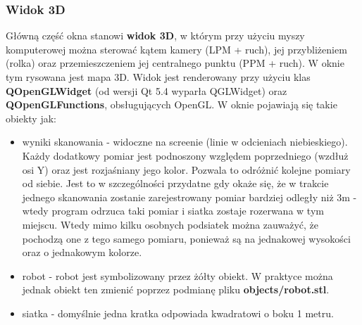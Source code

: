 \documentclass[a4paper,12pt]{article}
\begin{document}
\subsubsection{Widok 3D}
Główną część okna stanowi \textbf{widok 3D}, w którym przy użyciu myszy komputerowej można sterować kątem kamery (LPM + ruch), jej przybliżeniem (rolka) oraz przemieszczeniem jej centralnego punktu (PPM + ruch). W oknie tym rysowana jest mapa 3D.
 Widok jest renderowany przy użyciu klas \textbf{QOpenGLWidget} (od wersji Qt 5.4 wyparła QGLWidget) oraz \textbf{QOpenGLFunctions}, obsługujących OpenGL. W oknie pojawiają się takie obiekty jak:
\begin{itemize}
\item wyniki skanowania - widoczne na screenie (linie w odcieniach niebieskiego). Każdy dodatkowy pomiar jest podnoszony względem poprzedniego (wzdłuż osi Y) oraz jest rozjaśniany jego kolor. Pozwala to odróżnić kolejne pomiary od siebie. Jest to w szczególności przydatne gdy okaże się, że w trakcie jednego skanowania zostanie zarejestrowany pomiar bardziej odległy niż 3m - wtedy program odrzuca taki pomiar i siatka zostaje rozerwana w tym miejscu. Wtedy mimo kilku osobnych podsiatek można zauważyć, że pochodzą one z tego samego pomiaru, ponieważ są na jednakowej wysokości oraz o jednakowym kolorze.
\item robot - robot jest symbolizowany przez żółty obiekt. W praktyce można jednak obiekt ten zmienić poprzez podmianę pliku \textbf{objects/robot.stl}.
\item siatka - domyślnie jedna kratka odpowiada kwadratowi o boku 1 metru. 
\end{itemize}
\end{document}
